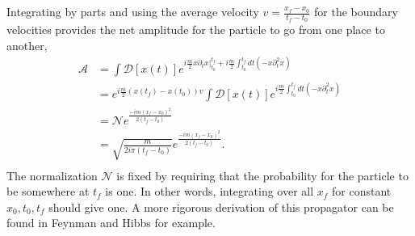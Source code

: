 Integrating by parts and using the average velocity $v = \frac{x_f-x_0}{t_f - t_0}$ for the boundary velocities provides the net amplitude for the particle to go from one place to another,
\begin{equation}
\begin{split}
\mathcal{A} &= \int \mathcal{D}[x(t)] e^{i\frac{m}{2}x\partial_t x|^{t_f}_{t_0} + i\frac{m}{2}\int_{t_0}^{t_f} dt (-x \partial^2_t x)} \\ 
            &= e^{i\frac{m}{2}(x(t_f) - x(t_0))v}\int \mathcal{D}[x(t)] e^{i\frac{m}{2}\int_{t_0}^{t_f} dt (-x \partial^2_t x)} \\
            &= \mathcal{N}e^{\frac{-im(x_f - x_0)^2}{2(t_f - t_0)}} \\
            &= \sqrt{\frac{m}{2i\pi(t_f-t_0)}}e^{\frac{-im(x_f - x_0)^2}{2(t_f - t_0)}}. \\
\end{split}
\end{equation}
The normalization $\mathcal{N}$ is fixed by requiring that the probability for the particle to be somewhere at $t_f$ is one. In other words, integrating over all $x_f$ for constant $x_0, t_0, t_f$ should give one. A more rigorous derivation of this propagator can be found in {\color{red} Feynman and Hibbs} for example.

